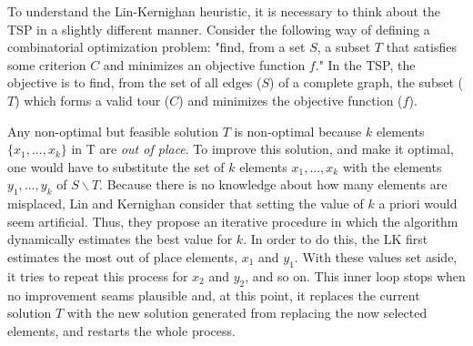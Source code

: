 To understand the Lin-Kernighan heuristic, it is necessary to think about the TSP in a slightly different manner. Consider the following way of defining a combinatorial optimization problem: "find, from a set $S$, a subset $T$ that satisfies some criterion $C$ and minimizes an objective function $f$." In the TSP, the objective is to find, from the set of all edges ($S$) of a complete graph, the subset ($T$) which forms a valid tour ($C$) and minimizes the objective function ($f$). 

Any non-optimal but feasible solution $T$ is non-optimal because $k$ elements $\{x_1, ..., x_k\}$ in T are \textit{out of place}. To improve this solution, and make it optimal, one would have to substitute the set of $k$ elements $x_1, ..., x_k$ with the elements $y_1, ..., y_k$ of $S \backslash T$. Because there is no knowledge about how many elements are misplaced, Lin and Kernighan consider that setting the value of $k$ a priori would seem artificial. Thus, they propose an iterative procedure in which the algorithm dynamically estimates the best value for $k$. In order to do this, the LK first estimates the most out of place elements, $x_1$ and $y_1$. With these values set aside, it tries to repeat this process for $x_2$ and $y_2$, and so on. This inner loop stops when no improvement seams plausible and, at this point, it replaces the current solution $T$ with the new solution generated from replacing the now selected elements, and restarts the whole process. 



